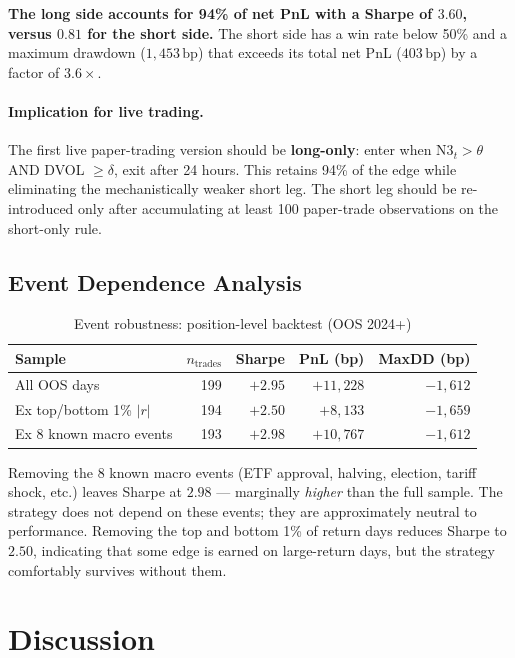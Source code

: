 \documentclass[12pt, a4paper]{article}
\theoremstyle{plain}
\theoremstyle{definition}
\newcommand{\bp}{\,\mathrm{bp}}
\begin{document}
\textbf{The long side accounts for 94\% of net PnL with a Sharpe of $3.60$,
versus $0.81$ for the short side.}
The short side has a win rate below 50\% and a maximum drawdown ($1{,}453\bp$)
that exceeds its total net PnL ($403\bp$) by a factor of $3.6\times$.

\paragraph{Implication for live trading.}
The first live paper-trading version should be \textbf{long-only}: enter
when N3$_t > \theta$ AND DVOL $\geq \delta$, exit after 24 hours.
This retains 94\% of the edge while eliminating the mechanistically weaker
short leg. The short leg should be re-introduced only after accumulating
at least 100 paper-trade observations on the short-only rule.

\subsection{Event Dependence Analysis}

\begin{table}[H]
\centering
\caption{Event robustness: position-level backtest (OOS 2024+)}
\label{tab:backtest_events}
\begin{tabular}{lrrrr}
\toprule
Sample & $n_{\text{trades}}$ & Sharpe & PnL (bp) & MaxDD (bp) \\
\midrule
All OOS days              & 199 & $+2.95$ & $+11{,}228$ & $-1{,}612$ \\
Ex top/bottom 1\% $|r|$  & 194 & $+2.50$ & $+8{,}133$  & $-1{,}659$ \\
Ex 8 known macro events   & 193 & $+2.98$ & $+10{,}767$ & $-1{,}612$ \\
\bottomrule
\end{tabular}
\end{table}

Removing the 8 known macro events (ETF approval, halving, election,
tariff shock, etc.) leaves Sharpe at $2.98$ --- marginally \emph{higher}
than the full sample. The strategy does not depend on these events;
they are approximately neutral to performance. Removing the top and bottom
1\% of return days reduces Sharpe to $2.50$, indicating that some edge
is earned on large-return days, but the strategy comfortably survives
without them.


\section{Discussion}
\label{sec:discussion}
\end{document}
